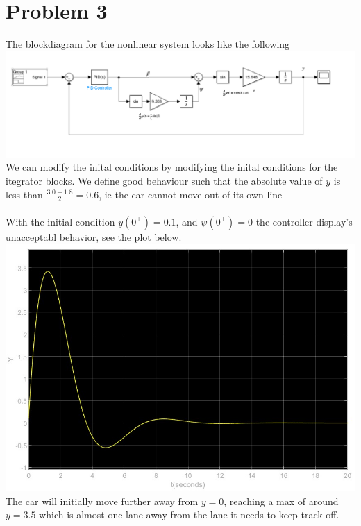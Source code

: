 \documentclass[12pt]{article}
\begin{document}
\section*{Problem 3}
The blockdiagram for the nonlinear system looks like the following\\
\includegraphics[scale=0.4]{Problem3BlockDiagram.PNG}\\
We can modify the inital conditions by modifying the inital conditions for the itegrator blocks. We define good behaviour such that the absolute value of $y$ is less than
$\frac{3.0-1.8}{2}=0.6$, ie the car cannot move out of its own line
\\\\
With the initial condition $y(0^+)=0.1$, and $\psi(0^+)=0$ the controller display's unacceptabl behavior, see the plot below.\\
\includegraphics[scale=0.5]{Problem3y0.1psi0.jpg}\\
The car will initially move further away from $y=0$, reaching a max of around $y=3.5$ which is almost one lane away from the lane it needs to keep track off.
\end{document}
